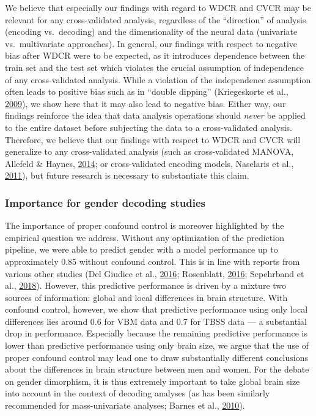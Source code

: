 \documentclass[12pt,american,a4paper,oneside,]{memoir} %
\begin{document}
We believe that especially our findings with regard to WDCR and CVCR may be relevant for any cross-validated analysis, regardless of the ``direction'' of analysis (encoding vs.~decoding) and the dimensionality of the neural data (univariate vs.~multivariate approaches). In general, our findings with respect to negative bias after WDCR were to be expected, as it introduces dependence between the train set and the test set which violates the crucial assumption of independence of any cross-validated analysis. While a violation of the independence assumption often leads to positive bias such as in ``double dipping'' (Kriegeskorte et al., \protect\hyperlink{ref-kriegeskorte2009circular}{2009}), we show here that it may also lead to negative bias. Either way, our findings reinforce the idea that data analysis operations should \emph{never} be applied to the entire dataset before subjecting the data to a cross-validated analysis. Therefore, we believe that our findings with respect to WDCR and CVCR will generalize to any cross-validated analysis (such as cross-validated MANOVA, Allefeld \& Haynes, \protect\hyperlink{ref-allefeld2014searchlight}{2014}; or cross-validated encoding models, Naselaris et al., \protect\hyperlink{ref-Naselaris2011-oh}{2011}), but future research is necessary to substantiate this claim.

\hypertarget{importance-for-gender-decoding-studies}{%
\subsubsection{Importance for gender decoding studies}\label{importance-for-gender-decoding-studies}}

The importance of proper confound control is moreover highlighted by the empirical question we address. Without any optimization of the prediction pipeline, we were able to predict gender with a model performance up to approximately 0.85 without confound control. This is in line with reports from various other studies (Del Giudice et al., \protect\hyperlink{ref-Del_Giudice2016-ns}{2016}; Rosenblatt, \protect\hyperlink{ref-Rosenblatt2016-oy}{2016}; Sepehrband et al., \protect\hyperlink{ref-Sepehrband2018-dy}{2018}). However, this predictive performance is driven by a mixture two sources of information: global and local differences in brain structure. With confound control, however, we show that predictive performance using only local differences lies around 0.6 for VBM data and 0.7 for TBSS data --- a substantial drop in performance. Especially because the remaining predictive performance is lower than predictive performance using only brain size, we argue that the use of proper confound control may lead one to draw substantially different conclusions about the differences in brain structure between men and women. For the debate on gender dimorphism, it is thus extremely important to take global brain size into account in the context of decoding analyses (as has been similarly recommended for mass-univariate analyses; Barnes et al., \protect\hyperlink{ref-Barnes2010-pu}{2010}).
\end{document}
